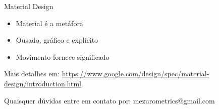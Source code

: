 \documentclass[final]{beamer} %
\begin{document}
\begin{frame}{}
\begin{block}{\large Material Design}
      \begin{itemize}
        \item Material é a metáfora
        \item Ousado, gráfico e explícito
        \item Movimento fornece significado
      \end{itemize}

      Mais detalhes em: \url{https://www.google.com/design/spec/material-design/introduction.html}
    \end{block}
    \vfill
    {\large Quaisquer dúvidas entre em contato por: mezurometrics@gmail.com}
    \vfill
  \end{frame}
\end{document}
